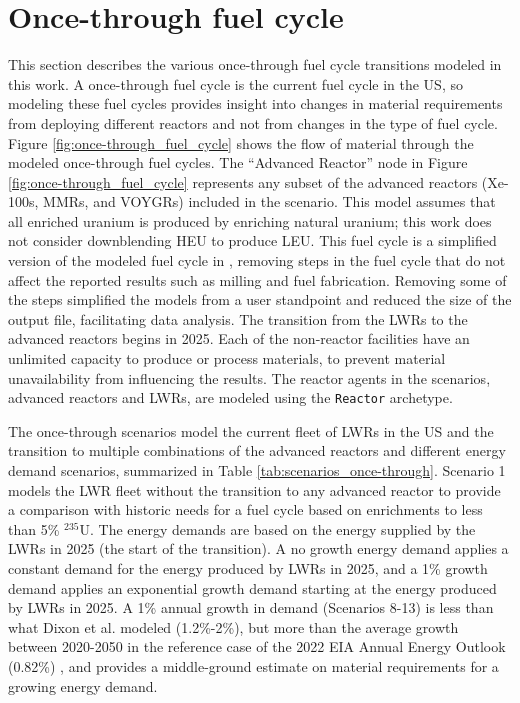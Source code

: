 \section{Once-through fuel cycle} \label{sec:once-through-methods}
This section describes the various once-through fuel cycle transitions 
modeled in this work. A once-through fuel cycle is the current 
fuel cycle in the US, so modeling these fuel cycles provides insight 
into changes in material requirements from deploying different 
reactors and not from changes in the type of fuel cycle.
Figure \ref{fig:once-through_fuel_cycle} shows the flow of material through 
the modeled once-through fuel cycles. The 
``Advanced Reactor'' node in Figure 
\ref{fig:once-through_fuel_cycle} represents any subset of the advanced 
reactors (Xe-100s, \glspl{MMR}, and VOYGRs) included 
in the scenario. This model assumes that all enriched uranium is produced 
by enriching natural uranium; this work does not consider downblending \gls{HEU} 
to produce \gls{LEU}. 
This fuel cycle is a simplified version of the modeled fuel cycle in 
\cite{bachmann_enrichment_2021}, removing steps in the fuel cycle that 
do not affect the reported results such as milling and fuel fabrication. 
Removing some of the steps simplified 
the models from a user standpoint and reduced the size of the \Cyclus 
output file, facilitating data analysis. The transition from the 
\glspl{LWR} to the advanced reactors begins in 2025. Each of the non-reactor 
facilities have an unlimited capacity to produce or process materials,
to prevent material unavailability from influencing the results. 
The reactor agents in the scenarios, 
advanced reactors and \glspl{LWR}, are modeled using the \Cycamore 
\texttt{Reactor} archetype.



The once-through scenarios model the current fleet of \glspl{LWR} in the 
US and the transition to multiple combinations of the advanced reactors 
and different energy demand scenarios, summarized in Table 
\ref{tab:scenarios_once-through}. Scenario 1 models the \gls{LWR} fleet 
without the transition to any advanced reactor to provide a comparison with 
historic needs for a fuel cycle based on enrichments to less than 5\% $^{235}$U. 
The energy demands are based on the energy supplied by the \glspl{LWR} in 
2025 (the start of the transition). A no growth energy demand applies a 
constant demand for the energy produced by \glspl{LWR} in 2025, and a 1\% 
growth demand applies an exponential growth demand starting at the energy 
produced by \glspl{LWR} in 2025. A 1\% annual growth in demand (Scenarios 8-13) 
is less than what Dixon et al. \cite{dixon_estimated_2022} modeled
(1.2\%-2\%), but more than the average growth between 2020-2050 in the 
reference case of the 2022 \gls{EIA} Annual Energy Outlook (0.82\%)
\cite{us_energy_information_administration_annual_2022}, and 
provides a middle-ground estimate on material requirements for a growing 
energy demand. 

